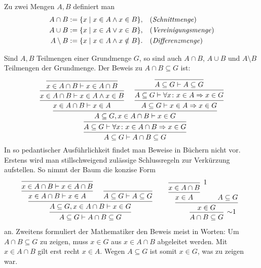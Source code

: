 \begin{Definition}%
\newlinefirst
Zu zwei Mengen $A,B$ definiert man
\begin{align*}
A\cap B &:= \{x\mid x\in A\land x\in B\}, && \text{(\emph{Schnittmenge})}\\
A\cup B &:= \{x\mid x\in A\lor x\in B\}, && \text{(\emph{Vereinigungsmenge})}\\
A\setminus B &:= \{x\mid x\in A\land x\notin B\}. && \text{(\emph{Differenzmenge})}
\end{align*}
\end{Definition}
Sind $A,B$ Teilmengen einer Grundmenge $G$, so sind auch
$A\cap B$, $A\cup B$ und $A\setminus B$ Teilmengen der Grundmenge.
Der Beweis zu $A\cap B\subseteq G$ ist:
\[
\begin{prooftree}
          \infer0{x\in A\cap B\vdash x\in A\cap B}
        \infer1{x\in A\cap B\vdash x\in A\land x\in B}
      \infer1{x\in A\cap B\vdash x\in A}
          \infer0{A\subseteq G\vdash A\subseteq G}
        \infer1{A\subseteq G\vdash \forall x\colon x\in A\cond x\in G}
      \infer1{A\subseteq G\vdash x\in A\cond x\in G}
    \infer2{A\subseteq G, x\in A\cap B\vdash x\in G}
  \infer1{A\subseteq G\vdash\forall x\colon x\in A\cap B\cond x\in G}
\infer1{A\subseteq G\vdash A\cap B\subseteq G}
\end{prooftree}
\]
In so pedantischer Ausführlichkeit findet man Beweise in Büchern
nicht vor. Erstens wird man stillschweigend zulässige Schlussregeln zur
Verkürzung aufstellen. So nimmt der Baum die konzise Form
\[
\begin{array}{@{}l@{\qquad\;}l}
\begin{prooftree}[center = false]
      \infer0{x\in A\cap B\vdash x\in A\cap B}
    \infer1{x\in A\cap B\vdash x\in A}
    \infer0{A\subseteq G\vdash A\subseteq G}
  \infer2{A\subseteq G,x\in A\cap B\vdash x\in G}
\infer1{A\subseteq G\vdash A\cap B\subseteq G}
\end{prooftree}
&
\begin{prooftree}[center = false]
      \infer0[1]{x\in A\cap B}
    \infer1{x\in A}
    \hypo{A\subseteq G}
  \infer2{x\in G}
\infer1[$\sim$1]{A\cap B\subseteq G}
\end{prooftree}
\end{array}
\]
an. Zweitens formuliert der Mathematiker den Beweis meist in Worten:
Um $A\cap B\subseteq G$ zu zeigen, muss $x\in G$ aus $x\in A\cap B$
abgeleitet werden. Mit $x\in A\cap B$ gilt erst recht $x\in A$.
Wegen $A\subseteq G$ ist somit $x\in G$, was zu zeigen war.\,\qedsymbol

